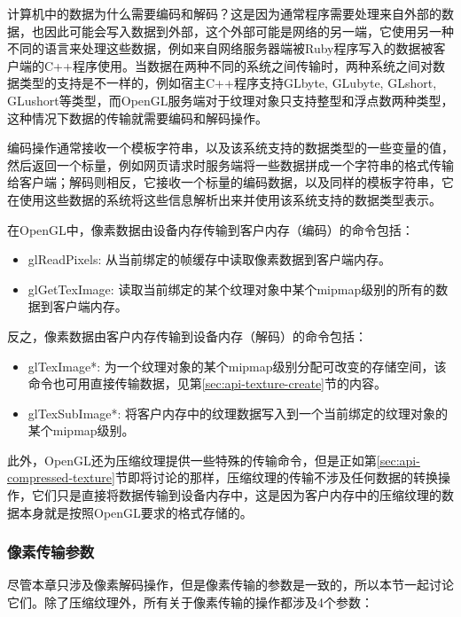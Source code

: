 \begin{myshaded}
	计算机中的数据为什么需要编码和解码？这是因为通常程序需要处理来自外部的数据，也因此可能会写入数据到外部，这个外部可能是网络的另一端，它使用另一种不同的语言来处理这些数据，例如来自网络服务器端被Ruby程序写入的数据被客户端的C++程序使用。当数据在两种不同的系统之间传输时，两种系统之间对数据类型的支持是不一样的，例如宿主C++程序支持GLbyte, GLubyte, GLshort, GLushort等类型，而OpenGL服务端对于纹理对象只支持整型和浮点数两种类型，这种情况下数据的传输就需要编码和解码操作。
	
	编码操作通常接收一个模板字符串，以及该系统支持的数据类型的一些变量的值，然后返回一个标量，例如网页请求时服务端将一些数据拼成一个字符串的格式传输给客户端；解码则相反，它接收一个标量的编码数据，以及同样的模板字符串，它在使用这些数据的系统将这些信息解析出来并使用该系统支持的数据类型表示。
\end{myshaded}

在OpenGL中，像素数据由设备内存传输到客户内存（编码）的命令包括：

\begin{itemize}
	\item glReadPixels: 从当前绑定的帧缓存中读取像素数据到客户端内存。
	\item glGetTexImage: 读取当前绑定的某个纹理对象中某个mipmap级别的所有的数据到客户端内存。
\end{itemize}

反之，像素数据由客户内存传输到设备内存（解码）的命令包括：

\begin{itemize}
	\item glTexImage*: 为一个纹理对象的某个mipmap级别分配可改变的存储空间，该命令也可用直接传输数据，见第\ref{sec:api-texture-create}节的内容。
	\item glTexSubImage*: 将客户内存中的纹理数据写入到一个当前绑定的纹理对象的某个mipmap级别。
\end{itemize}

此外，OpenGL还为压缩纹理提供一些特殊的传输命令，但是正如第\ref{sec:api-compressed-texture}节即将讨论的那样，压缩纹理的传输不涉及任何数据的转换操作，它们只是直接将数据传输到设备内存中，这是因为客户内存中的压缩纹理的数据本身就是按照OpenGL要求的格式存储的。





\subsubsection{像素传输参数}
尽管本章只涉及像素解码操作，但是像素传输的参数是一致的，所以本节一起讨论它们。除了压缩纹理外，所有关于像素传输的操作都涉及4个参数：


